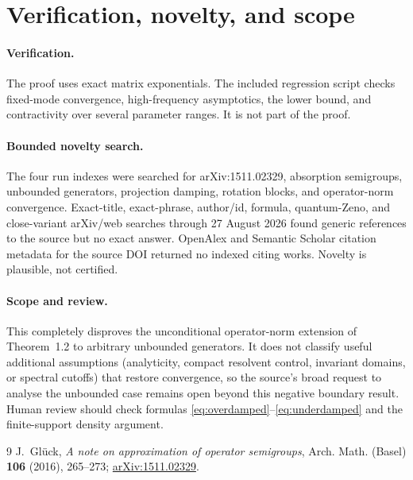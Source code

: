 \documentclass[11pt]{article}
\begin{document}
\section{Verification, novelty, and scope}

\paragraph{Verification.}
The proof uses exact matrix exponentials. The included regression script
checks fixed-mode convergence, high-frequency asymptotics, the lower bound,
and contractivity over several parameter ranges. It is not part of the proof.

\paragraph{Bounded novelty search.}
The four run indexes were searched for arXiv:1511.02329, absorption semigroups,
unbounded generators, projection damping, rotation blocks, and operator-norm
convergence. Exact-title, exact-phrase, author/id, formula, quantum-Zeno, and
close-variant arXiv/web searches through 27 August 2026 found generic references
to the source but no exact answer. OpenAlex and Semantic Scholar citation
metadata for the source DOI returned no indexed citing works. Novelty is
plausible, not certified.

\paragraph{Scope and review.}
This completely disproves the unconditional operator-norm extension of
Theorem~1.2 to arbitrary unbounded generators. It does not classify useful
additional assumptions (analyticity, compact resolvent control, invariant
domains, or spectral cutoffs) that restore convergence, so the source's broad
request to analyse the unbounded case remains open beyond this negative
boundary result. Human review should check formulas
\eqref{eq:overdamped}--\eqref{eq:underdamped} and the finite-support density
argument.

\begingroup
\sloppy
\raggedright
\begin{thebibliography}{9}
J.~Gl\"uck,
\emph{A note on approximation of operator semigroups},
Arch. Math. (Basel) \textbf{106} (2016), 265--273;
\href{https://arxiv.org/abs/1511.02329}{arXiv:1511.02329}.
\end{thebibliography}
\endgroup
\end{document}
